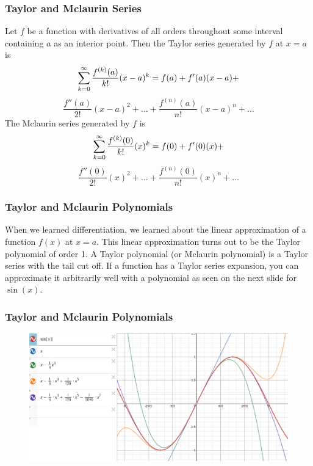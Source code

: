 \documentclass[xcolor=dvipsnames]{beamer}
\begin{document}
  \begin{frame}
    \frametitle{Taylor and Mclaurin Series}
    Let $f$ be a function with derivatives of all orders throughout
    some interval containing $a$ as an interior point. Then the
    \alert{Taylor series} generated by $f$ at $x=a$ is
    \begin{equation}
      \label{eq:oetaenis}
      \sum_{k=0}^{\infty}\frac{f^{(k)}(a)}{k!}(x-a)^{k}=f(a)+f'(a)(x-a)+\notag
    \end{equation}
    \begin{equation}
      \label{eq:ikooveiv}
      \frac{f''(a)}{2!}(x-a)^{2}+{\ldots}+\frac{f^{(n)}(a)}{n!}(x-a)^{n}+{\ldots}
    \end{equation}
    The \alert{Mclaurin series} generated by $f$ is
    \begin{equation}
      \label{eq:ohyoobip}
      \sum_{k=0}^{\infty}\frac{f^{(k)}(0)}{k!}(x)^{k}=f(0)+f'(0)(x)+\notag
    \end{equation}
    \begin{equation}
      \label{eq:tolokaav}
      \frac{f''(0)}{2!}(x)^{2}+{\ldots}+\frac{f^{(n)}(0)}{n!}(x)^{n}+{\ldots}
    \end{equation}
  \end{frame}

\begin{frame}
  \frametitle{Taylor and Mclaurin Polynomials}
  When we learned differentiation, we learned about the linear
  approximation of a function $f(x)$ at $x=a$. This linear
  approximation turns out to be the Taylor polynomial of order 1. A
  Taylor polynomial (or Mclaurin polynomial) is a Taylor series with
  the tail cut off. If a function has a Taylor series expansion, you
  can approximate it arbitrarily well with a polynomial as seen on the
  next slide for $\sin(x)$.
\end{frame}

\begin{frame}
  \frametitle{Taylor and Mclaurin Polynomials}
    \begin{figure}[h]
    \includegraphics[scale=0.3]{./diagrams/sinappr.png}
  \end{figure}
\end{frame}
\end{document}
